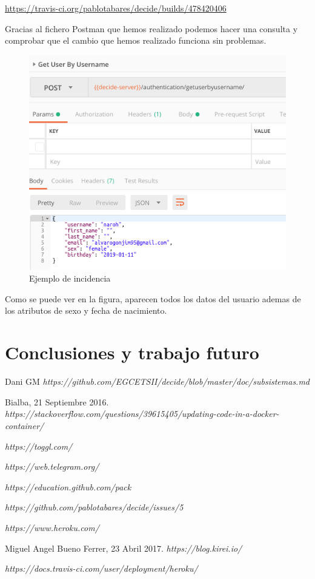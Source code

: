 \documentclass[12pt]{article}
\begin{document}
\url{https://travis-ci.org/pablotabares/decide/builds/478420406}

Gracias al fichero Postman que hemos realizado podemos hacer una consulta y comprobar que el cambio que hemos realizado funciona sin problemas.

\begin{figure}[h]
\centering
\includegraphics[width=1\textwidth]{call.png}
\caption{Ejemplo de incidencia}
\end{figure}

Como se puede ver en la figura, aparecen todos los datos del usuario ademas de los atributos de sexo y fecha de nacimiento.

\section{Conclusiones y trabajo futuro}

\newpage	


\begin{thebibliography}{9}
Dani GM
\textit
{https://github.com/EGCETSII/decide/blob/master/doc/subsistemas.md}

Bialba, 21 Septiembre 2016. 
\textit{https://stackoverflow.com/questions/39615405/updating-code-in-a-docker-container/}

\textit{https://toggl.com/}

\textit{https://web.telegram.org/}

\textit{https://education.github.com/pack}

\textit{https://github.com/pablotabares/decide/issues/5}

\textit{https://www.heroku.com/}

Miguel Angel Bueno Ferrer, 23 Abril 2017. 
\textit{https://blog.kirei.io/}

\textit{https://docs.travis-ci.com/user/deployment/heroku/}




\end{thebibliography}
\end{document}
